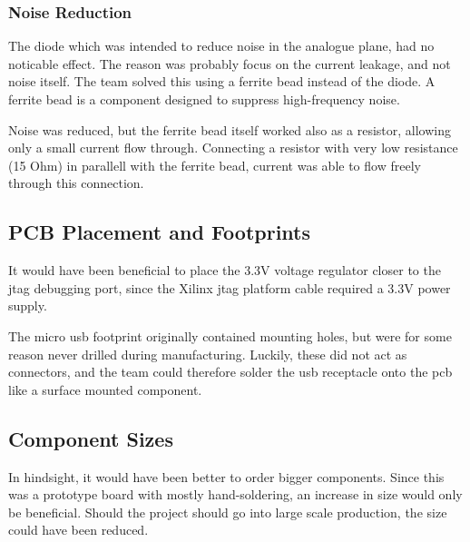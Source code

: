 \subsubsection{Noise Reduction}
The diode which was intended to reduce noise in the analogue plane, had no noticable effect.
The reason was probably focus on the current leakage, and not noise itself.
The team solved this using a ferrite bead instead of the diode.
A ferrite bead is a component designed to suppress high-frequency noise.

Noise was reduced, but the ferrite bead itself worked also as a resistor, allowing only a small current flow through.
Connecting a resistor with very low resistance (15 Ohm) in parallell with the ferrite bead, current was able to flow freely through this connection.

\subsection{PCB Placement and Footprints}
It would have been beneficial to place the 3.3V voltage regulator closer to the \gls{jtag} debugging port, since the Xilinx \gls{jtag} platform cable required a 3.3V power supply.

The micro \gls{usb} footprint originally contained mounting holes, but were for some reason never drilled during manufacturing.
Luckily, these did not act as connectors, and the team could therefore solder the \gls{usb} receptacle onto the \gls{pcb} like a surface mounted component.

\subsection{Component Sizes}
In hindsight, it would have been better to order bigger components.
Since this was a prototype board with mostly hand-soldering, an increase in size would only be beneficial.
Should the project should go into large scale production, the size could have been reduced.
